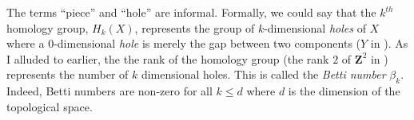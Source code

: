 The terms ``piece'' and ``hole'' are informal. Formally, we could say that the $k^{th}$ homology group, $H_k(X)$, represents the group of $k$-dimensional \textit{holes} of $X$ where a 0-dimensional \textit{hole} is merely the gap between two components (\eg $Y$ in ). As I alluded to earlier, the the rank of the homology group (\eg the rank $2$ of $\mathbf{Z}^2$ in ) represents the number of $k$ dimensional holes. This is called the \textit{Betti number} $\beta_k$. Indeed, Betti numbers are non-zero for all $k \leq d$ where $d$ is the dimension of the topological space.


